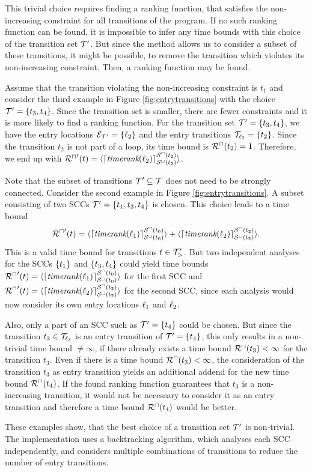 This trivial choice requires finding a ranking function, that satisfies the non-increasing constraint for all transitions of the program.
If no such ranking function can be found, it is impossible to infer any time bounds with this choice of the transition set $\mathcal{T}'$.
But since the method allows us to consider a subset of these transitions, it might be possible, to remove the transition which violates its non-increasing constraint.
Then, a ranking function may be found.

Assume that the transition violating the non-increasing constraint is $t_1$ and consider the third example in Figure \ref{fig:entrytransitions} with the choice $\mathcal{T}' = \lbrace t_3, t_4 \rbrace$.
Since the transition set is smaller, there are fewer constraints and it is more likely to find a ranking function.
For the transition set $\mathcal{T}' = \lbrace t_3, t_4 \rbrace$, we have the entry locations $\mathcal{E}_{\mathcal{T}'} = \lbrace \ell_2 \rbrace$ and the entry transitions $\mathcal{T}_{\ell_2} = \lbrace t_2 \rbrace$.
Since the transition $t_2$ is not part of a loop, its time bound is ${\mathcal{R}^\sqcap}(t_2) = 1$.
Therefore, we end up with ${\mathcal{R}^\sqcap}'(t) = \langle\lceil \emph{timerank}(\ell_2) \rceil^{{\mathcal{S}^\sqcap}(t_2)}_{{\mathcal{S}^\sqcup}(t_2)}\rangle$.

Note that the subset of transitions $\mathcal{T}' \subseteq \mathcal{T}$ does not need to be strongly connected.
Consider the second example in Figure \ref{fig:entrytransitions}.
A subset consisting of two SCCs $\mathcal{T}' = \lbrace t_1, t_3, t_4 \rbrace$ is chosen.
This choice leads to a time bound \[ {\mathcal{R}^\sqcap}'(t) = \langle\lceil \emph{timerank}(\ell_1) \rceil^{{\mathcal{S}^\sqcap}(t_0)}_{{\mathcal{S}^\sqcup}(t_0)}\rangle + \langle\lceil \emph{timerank}(\ell_2) \rceil^{{\mathcal{S}^\sqcap}(t_2)}_{{\mathcal{S}^\sqcup}(t_2)}\rangle. \]
This is a valid time bound for transitions $t \in \mathcal{T}'_>$.
But two independent analyses for the SCCs $\lbrace t_1 \rbrace$ and $\lbrace t_3, t_4 \rbrace$ could yield time bounds ${\mathcal{R}^\sqcap}'(t) = \langle\lceil \emph{timerank}(\ell_1) \rceil^{{\mathcal{S}^\sqcap}(t_0)}_{{\mathcal{S}^\sqcup}(t_0)}\rangle$ for the first SCC and ${\mathcal{R}^\sqcap}'(t) = \langle\lceil \emph{timerank}(\ell_2) \rceil^{{\mathcal{S}^\sqcap}(t_2)}_{{\mathcal{S}^\sqcup}(t_2)}\rangle$ for the second SCC, since each analysis would now consider its own entry locations $\ell_1$ and $\ell_2$.

Also, only a part of an SCC such as $\mathcal{T}' = \lbrace t_4 \rbrace$ could be chosen.
But since the transition $t_3 \in \mathcal{T}_{\ell_3}$ is an entry transition of $\mathcal{T}' = \lbrace t_4 \rbrace$, this only results in a non-trivial time bound $\neq \infty$, if there already exists a time bound ${\mathcal{R}^\sqcap}(t_3) < \infty$ for the transition $t_3$.
Even if there is a time bound ${\mathcal{R}^\sqcap}(t_3) < \infty$, the consideration of the transition $t_3$ as entry transition yields an additional addend for the new time bound ${\mathcal{R}^\sqcap}(t_4)$.
If the found ranking function guarantees that $t_3$ is a non-increasing transition, it would not be necessary to consider it as an entry transition and therefore a time bound ${\mathcal{R}^\sqcap}(t_4)$ would be better.

These examples show, that the best choice of a transition set $\mathcal{T}'$ is non-trivial.
The implementation uses a backtracking algorithm, which analyses each SCC independently, and considers multiple combinations of transitions to reduce the number of entry transitions.
